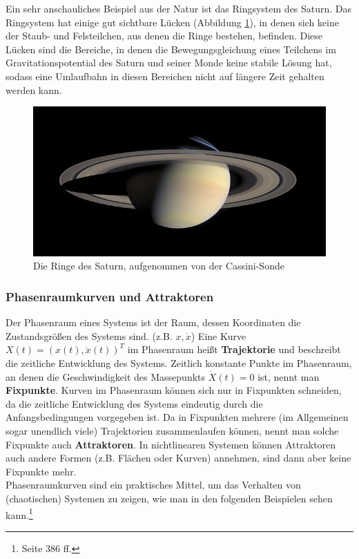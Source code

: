 Ein sehr anschauliches Beispiel aus der Natur ist das Ringsystem des Saturn. Das Ringsystem hat einige gut sichtbare Lücken (Abbildung \ref{foto-saturn}), in denen sich keine der Staub- und Felsteilchen, aus denen die Ringe bestehen, befinden. Diese Lücken sind die Bereiche, in denen die Bewegungsgleichung eines Teilchens im Gravitationspotential des Saturn und seiner Monde keine stabile Lösung hat, sodass eine Umlaufbahn in diesen Bereichen nicht auf längere Zeit gehalten werden kann.
\\
\begin{figure}
\includegraphics[width=1.0\textwidth]{images/saturn.jpg}
\caption{Die Ringe des Saturn, aufgenommen von der Cassini-Sonde}
\label{foto-saturn}
\end{figure}

\subsubsection{Phasenraumkurven und Attraktoren}
Der Phasenraum eines Systems ist der Raum, dessen Koordinaten die Zustandsgrößen des Systems sind. (z.B. $x, \dot{x}$) Eine Kurve $X(t) = (x(t), \dot{x}(t))^T$ im Phasenraum heißt \textbf{Trajektorie} und beschreibt die zeitliche Entwicklung des Systems. Zeitlich konstante Punkte im Phasenraum, an denen die Geschwindigkeit des Massepunkts $\dot{X}(t) = 0$  ist, nennt man \textbf{Fixpunkte}. Kurven im Phasenraum können sich nur in Fixpunkten schneiden, da die zeitliche Entwicklung des Systems eindeutig durch die Anfangsbedingungen vorgegeben ist. Da in Fixpunkten mehrere (im Allgemeinen sogar unendlich viele) Trajektorien zusammenlaufen können, nennt man solche Fixpunkte auch \textbf{Attraktoren}. In nichtlinearen Systemen können Attraktoren auch andere Formen (z.B. Flächen oder Kurven) annehmen, sind dann aber keine Fixpunkte mehr.
\\
Phasenraumkurven sind ein praktisches Mittel, um das Verhalten von (chaotischen) Systemen zu zeigen, wie man in den folgenden Beispielen sehen kann.\footnote{\cite{troeder} Seite 386 ff.}

